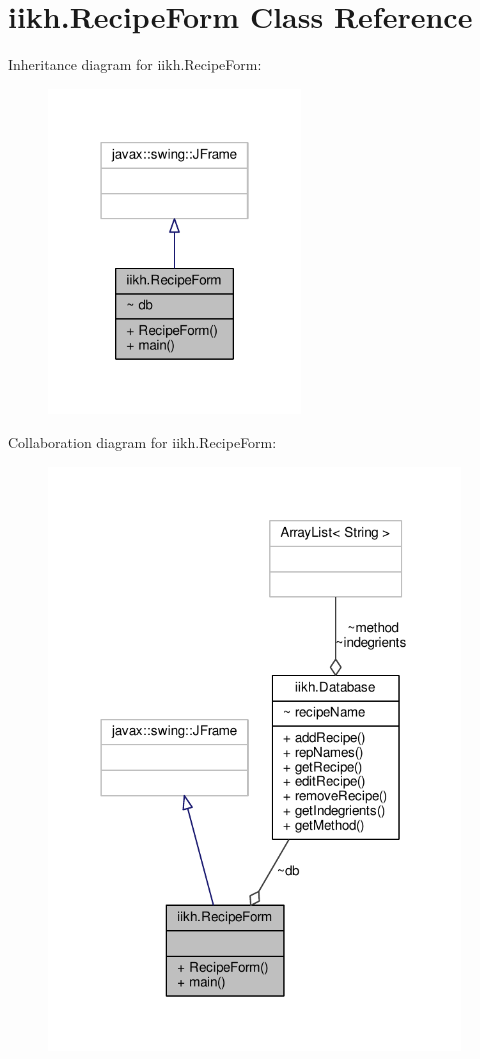 \hypertarget{classiikh_1_1RecipeForm}{\section{iikh.\-Recipe\-Form Class Reference}
\label{classiikh_1_1RecipeForm}
}


Inheritance diagram for iikh.\-Recipe\-Form\-:
\nopagebreak
\begin{figure}[H]
\begin{center}
\leavevmode
\includegraphics[width=190pt]{classiikh_1_1RecipeForm__inherit__graph}
\end{center}
\end{figure}


Collaboration diagram for iikh.\-Recipe\-Form\-:
\nopagebreak
\begin{figure}[H]
\begin{center}
\leavevmode
\includegraphics[width=310pt]{classiikh_1_1RecipeForm__coll__graph}
\end{center}
\end{figure}
